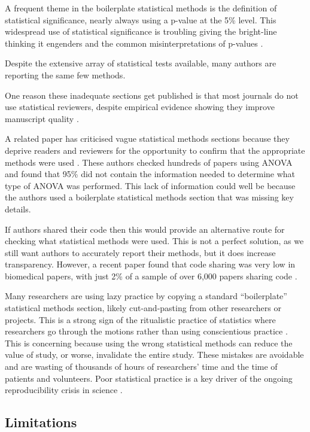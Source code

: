 \documentclass[12pt]{article}
\begin{document}
A frequent theme in the boilerplate statistical methods is the
definition of statistical significance, nearly always using a p-value at
the 5\% level. This widespread use of statistical significance is
troubling giving the bright-line thinking it engenders
\citep{McShane2019} and the common misinterpretations of p-values
\citep{Goodman2008}.

Despite the extensive array of statistical tests available, many authors
are reporting the same few methods.

One reason these inadequate sections get published is that most journals
do not use statistical reviewers, despite empirical evidence showing
they improve manuscript quality \citep{Hardwicke2020}.

A related paper has criticised vague statistical methods sections
because they deprive readers and reviewers for the opportunity to
confirm that the appropriate methods were used \citep{Weissgerber2018}.
These authors checked hundreds of papers using ANOVA and found that 95\%
did not contain the information needed to determine what type of ANOVA
was performed. This lack of information could well be because the
authors used a boilerplate statistical methods section that was missing
key details.

If authors shared their code then this would provide an alternative
route for checking what statistical methods were used. This is not a
perfect solution, as we still want authors to accurately report their
methods, but it does increase transparency. However, a recent paper
found that code sharing was very low in biomedical papers, with just 2\%
of a sample of over 6,000 papers sharing code \citep{Serghiou2021}.

Many researchers are using lazy practice by copying a standard
``boilerplate'' statistical methods section, likely cut-and-pasting from
other researchers or projects. This is a strong sign of the ritualistic
practice of statistics where researchers go through the motions rather
than using conscientious practice \citep{Stark2018}. This is concerning
because using the wrong statistical methods can reduce the value of
study, or worse, invalidate the entire study. These mistakes are
avoidable and are wasting of thousands of hours of researchers' time and
the time of patients and volunteers. Poor statistical practice is a key
driver of the ongoing reproducibility crisis in science
\citep{Ioannidis2014}.

\hypertarget{limitations}{%
\subsection{Limitations}\label{limitations}}
\end{document}
